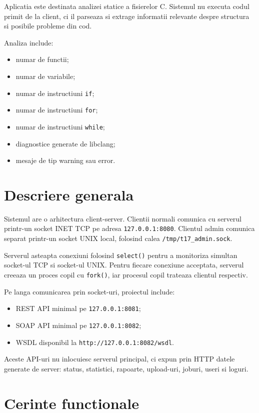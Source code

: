 \documentclass[12pt,a4paper]{article}
\begin{document}
Aplicatia este destinata analizei statice a fisierelor C. Sistemul nu executa codul primit de la client, ci il parseaza si extrage informatii relevante despre structura si posibile probleme din cod.

Analiza include:

\begin{itemize}
    \item numar de functii;
    \item numar de variabile;
    \item numar de instructiuni \texttt{if};
    \item numar de instructiuni \texttt{for};
    \item numar de instructiuni \texttt{while};
    \item diagnostice generate de libclang;
    \item mesaje de tip warning sau error.
\end{itemize}

\section{Descriere generala}

Sistemul are o arhitectura client-server. Clientii normali comunica cu serverul printr-un socket INET TCP pe adresa \texttt{127.0.0.1:8080}. Clientul admin comunica separat printr-un socket UNIX local, folosind calea \texttt{/tmp/t17\_admin.sock}.

Serverul asteapta conexiuni folosind \texttt{select()} pentru a monitoriza simultan socket-ul TCP si socket-ul UNIX. Pentru fiecare conexiune acceptata, serverul creeaza un proces copil cu \texttt{fork()}, iar procesul copil trateaza clientul respectiv.

Pe langa comunicarea prin socket-uri, proiectul include:

\begin{itemize}
    \item REST API minimal pe \texttt{127.0.0.1:8081};
    \item SOAP API minimal pe \texttt{127.0.0.1:8082};
    \item WSDL disponibil la \texttt{http://127.0.0.1:8082/wsdl}.
\end{itemize}

Aceste API-uri nu inlocuiesc serverul principal, ci expun prin HTTP datele generate de server: status, statistici, rapoarte, upload-uri, joburi, useri si loguri.

\section{Cerinte functionale}
\end{document}
